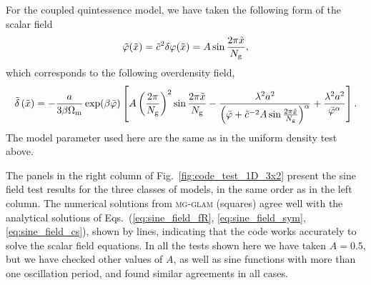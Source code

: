 For the coupled quintessence model, we have taken the following form of the scalar field
\begin{equation}\label{eq:sine_field_cs}
    \tilde{\varphi}(\tilde{x}) = \tilde{c}^2\delta\varphi(\tilde{x}) = A\sin\frac{2\pi\tilde{x}}{N_{\rm g}},
\end{equation}
which corresponds to the following overdensity field,
\begin{equation}
    \tilde{\delta}\left(\tilde{x}\right) = -\frac{a}{3\beta\Omega_{\rm m}}\exp(\beta\bar{\varphi})\left[A\left(\frac{2\pi}{N_{\rm g}}\right)^2\sin\frac{2\pi\tilde{x}}{N_{\rm g}}-\frac{\lambda^2a^2}{\left(\bar{\varphi}+\tilde{c}^{-2}A\sin\frac{2\pi\tilde{x}}{N_{\rm g}}\right)^\alpha} + \frac{\lambda^2a^2}{\bar{\varphi}^\alpha}\right].
\end{equation}
The model parameter used here are the same as in the uniform density test above.

The panels in the right column of Fig.~\ref{fig:code_test_1D_3x2} present the sine field test results for the three classes of models, in the same order as in the left column. The numerical solutions from \textsc{mg-glam} (squares) agree well with the analytical solutions of Eqs.~(\ref{eq:sine_field_fR}, \ref{eq:sine_field_sym}, \ref{eq:sine_field_cs}), shown by lines, indicating that the code works accurately to solve the scalar field equations. In all the tests shown here we have taken $A=0.5$, but we have checked other values of $A$, as well as sine functions with more than one oscillation period, and found similar agreements in all cases.




